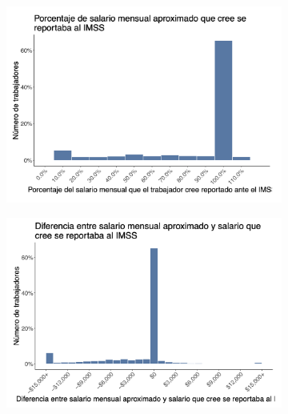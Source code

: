 \documentclass[oneside,11pt]{article}
\begin{document}
\begin{figure}[H]
\begin{center}
    \begin{subfigure}{0.49\textwidth}
    \includegraphics[width=\textwidth]{04_Figures/worker_survey/Exp_9.png}
    \end{subfigure}
    \begin{subfigure}{0.49\textwidth}
    \includegraphics[width=\textwidth]{04_Figures/worker_survey/Exp_10.png}
    \end{subfigure}
    

\end{center}
\end{figure}
\end{document}
